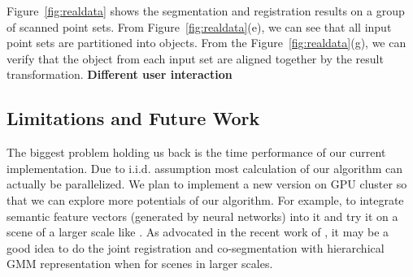 Figure~{\ref{fig:realdata}} shows the segmentation and registration results on a group of scanned point sets.
From Figure~\ref{fig:realdata}(e), we can see that all input point sets are partitioned into objects. From the Figure~\ref{fig:realdata}(g), we can verify that the object from each input set are aligned together by the result transformation.  
\textbf{Different user interaction}
\subsection{Limitations and Future Work}
The biggest problem holding us back is the time performance of our current implementation.  Due to i.i.d. assumption most calculation of our algorithm can actually be parallelized. We plan to implement a new version on GPU cluster so that we can explore more potentials of our algorithm. 
For example, to integrate semantic feature vectors (generated by neural networks) into it and try it on a scene of a larger scale like \cite{GOGMA}. 
As advocated in the recent work of \cite{AGM}, it may be a good idea to do the joint registration and co-segmentation with hierarchical GMM representation when for scenes in larger scales. 